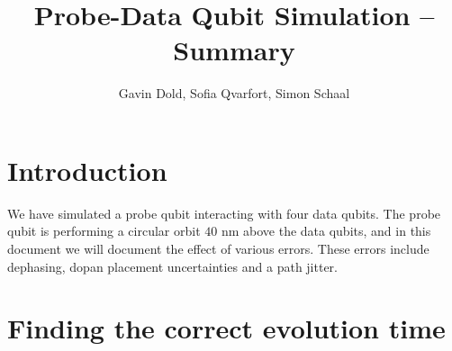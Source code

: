 



\usepackage{geometry}
\geometry{legalpaper, margin=1.0in}


\title{Probe-Data Qubit Simulation -- Summary}
\author{Gavin Dold, Sofia Qvarfort, Simon Schaal}
\maketitle
\tableofcontents
\section{Introduction}
We have simulated a probe qubit interacting with four data qubits. The probe qubit is performing a circular orbit $40$ nm above the data qubits, and in this document we will document the effect of various errors. These errors include dephasing, dopan placement uncertainties and a path jitter. 

\section{Finding the correct evolution time}

